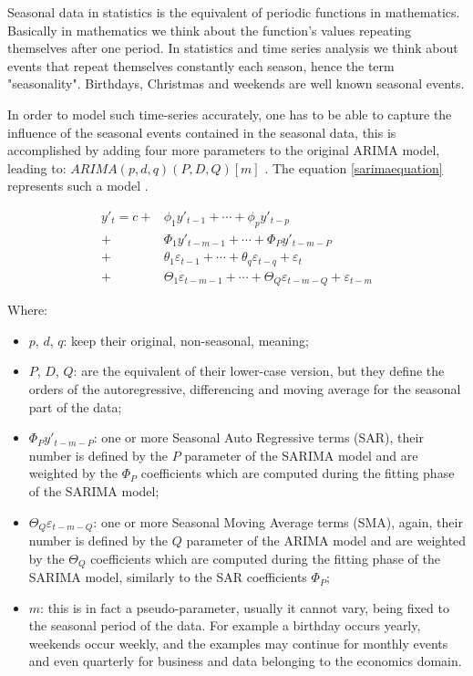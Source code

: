 \documentclass[12pt,a4paper,titlepage]{report}
\begin{document}
Seasonal data in statistics is the equivalent of periodic functions in mathematics. Basically in mathematics we think about the function's values repeating themselves after one period. In statistics and time series analysis we think about events that repeat themselves constantly each season, hence the term "seasonality". Birthdays, Christmas and weekends are well known seasonal events.

In order to model such time-series accurately, one has to be able to capture the influence of the seasonal events contained in the seasonal data, this is accomplished by adding four more parameters to the original ARIMA model, leading to: $ ARIMA(p, d, q)(P, D, Q)[m] $ \cite{fpp2seasonalarima}. The equation \ref{sarimaequation} represents such a model \cite{automatictimeseriesforecasting}.

\begin{equation}
\label{sarimaequation}
\begin{split}
y'_{t} = c + & \phi_{1}y'_{t-1} + \cdots + \phi_{p}y'_{t-p} \\
           + & \Phi_{1}y'_{t-m-1} + \cdots + \Phi_{P}y'_{t-m-P} \\
           + & \theta_{1}\varepsilon_{t-1} + \cdots + \theta_{q}\varepsilon_{t-q} + \varepsilon_{t} \\
           + & \Theta_{1}\varepsilon_{t-m-1} + \cdots + \Theta_{Q}\varepsilon_{t-m-Q} + \varepsilon_{t-m}
\end{split}
\end{equation}

Where:

\begin{itemize}
    \item $ p $, $ d $, $ q $: keep their original, non-seasonal, meaning;
    \item $ P $, $ D $, $ Q $: are the equivalent of their lower-case version, but they define the orders of the autoregressive, differencing and moving average for the seasonal part of the data;
    \item $ \Phi_{P}y'_{t-m-P} $: one or more Seasonal Auto Regressive terms (SAR), their number is defined by the $ P $ parameter of the SARIMA model and are weighted by the $ \Phi_{P} $ coefficients which are computed during the fitting phase of the SARIMA model;
    \item $ \Theta_{Q}\varepsilon_{t-m-Q} $: one or more Seasonal Moving Average terms (SMA), again, their number is defined by the $ Q $ parameter of the ARIMA model and are weighted by the $ \Theta_{Q} $ coefficients which are computed during the fitting phase of the SARIMA model, similarly to the SAR coefficients $ \Phi_{P} $;
    \item $ m $: this is in fact a pseudo-parameter, usually it cannot vary, being fixed to the seasonal period of the data. For example a birthday occurs yearly, weekends occur weekly, and the examples may continue for monthly events and even quarterly for business and data belonging to the economics domain.
\end{itemize}
\end{document}
